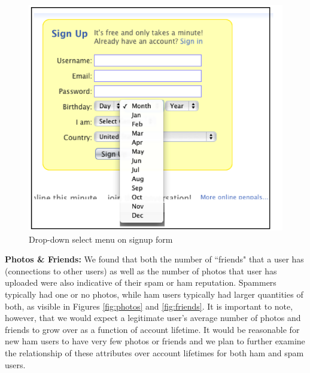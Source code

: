 \documentclass[preprint]{acm_proc_article-sp}
\begin{document}
\begin{figure}[h]
    \centering
    \includegraphics[width=\linewidth]{figures/dropdown.png}
    \caption{Drop-down select menu on signup form}
    \label{fig:drop}
\end{figure}

\textbf{Photos \& Friends:} We found that both the number of ``friends" that a user has (connections 
to other users) as well as the number of photos that user has uploaded were also indicative of their 
spam or ham reputation. Spammers typically had one or no photos, while ham users typically had larger 
quantities of both, as visible in Figures \ref{fig:photos} and \ref{fig:friends}. It is important to note, 
however, that we would expect a legitimate user's average number of photos and friends to grow over 
as a function of account lifetime. It would be reasonable for new ham users to have very few photos 
or friends and we plan to further examine the relationship of these attributes over account lifetimes 
for both ham and spam users.
\end{document}
